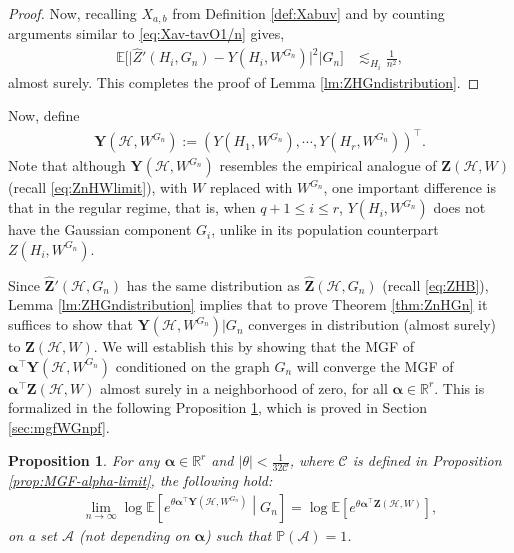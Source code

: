 \documentclass[11pt,reqno]{amsart}
\numberwithin{equation}{section}
\newcommand{\E}{\mathbb{E}}
\newtheorem{prop}{Proposition}[section]
\theoremstyle{definition}
\begin{document}
\begin{proof}
Now, recalling $X_{a,b}$ from Definition \ref{def:Xabuv} and by counting arguments similar to \eqref{eq:Xav-tavO1/n} gives, 
    \begin{align*}
        \E\bigg[\bigg|\hat Z'(H_i,G_n) - Y(H_i,W^{G_n})\bigg|^2 \bigg| G_n \bigg]
        &\lesssim_{H_i}\frac{1}{n^2} ,
    \end{align*}
    almost surely. This completes the proof of Lemma \ref{lm:ZHGndistribution}. 
    \end{proof}



Now, define 
\begin{align}\label{eq:def-Yn}
    \bm{Y}(\mathcal{H},W^{G_{n}}):=\left(Y(H_{1},W^{G_{n}}),\cdots, Y(H_{r},W^{G_{n}})\right)^{\top} . 
\end{align} 
Note that although $\bm{Y}(\mathcal{H},W^{G_{n}})$ resembles the empirical analogue of $\bm{Z}(\mathcal{H},W)$ (recall \eqref{eq:ZnHWlimit}), with $W$ replaced with $W^{G_{n}}$, one important difference is that in the regular regime, that is, when $q+1\leq i\leq  r$, $Y(H_i, W^{G_{n}})$ does not have the Gaussian component $G_i$, unlike in its population counterpart $Z(H_i, W^{G_{n}})$.  

Since $\hat{\bm Z}'( \mathcal{H}, G_{n})$ has the same distribution as $\hat{\bm Z}( \mathcal{H}, G_{n})$ (recall \eqref{eq:ZHB}), Lemma \ref{lm:ZHGndistribution} implies that to prove Theorem \ref{thm:ZnHGn} it suffices to show that $\bm{Y}(\mathcal{H},W^{G_{n}})|G_n$ converges in distribution (almost surely) to $\bm{Z}(\mathcal{H},W)$. We will establish this by showing that the MGF of $\bm \alpha^\top \bm{Y}(\mathcal{H},W^{G_n})$ conditioned on the graph $G_n$ will converge the MGF of $\bm{\alpha}^\top \bm{Z}(\mathcal{H},W)$ almost surely in a neighborhood of zero, for all $\bm{\alpha} \in \mathbb R^r$. This is formalized in the following Proposition \ref{prop:MGF-convg}, which is proved in Section \ref{sec:mgfWGnpf}. 


\begin{prop}\label{prop:MGF-convg} 
For any $\bm \alpha \in\mathbb{R}^{r}$ and $|\theta|<\frac{1}{32\mathcal{C}}$, where $\mathcal{C}$ is defined in Proposition \ref{prop:MGF-alpha-limit}, the following hold: 
\begin{align*}
    \lim_{n \rightarrow \infty }\log\mathbb{E}\left[ e^{\theta \bm{\alpha}^{\top}\bm{Y}(\mathcal{H},W^{G_{n}})}\middle|G_{n}\right] = \log\mathbb{E}\left[ e^{ \theta \bm{\alpha}^{\top}\bm{Z}(\mathcal{H},W) } \right] , 
\end{align*}
on a set $\mathcal{A}$ (not depending on $\bm \alpha$) such that $\mathbb P(\mathcal A) = 1$. 
\end{prop}
\end{document}
